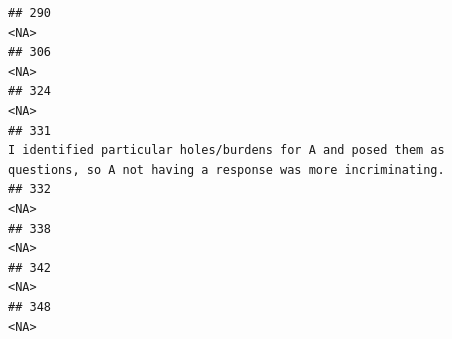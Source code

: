 \documentclass[
]{article}
\begin{document}
\begin{verbatim}
## 290                                                                                                                                                                                                                                                                                                                                                <NA>
## 306                                                                                                                                                                                                                                                                                                                                                <NA>
## 324                                                                                                                                                                                                                                                                                                                                                <NA>
## 331                                                                                                                                                                                                                         I identified particular holes/burdens for A and posed them as questions, so A not having a response was more incriminating.
## 332                                                                                                                                                                                                                                                                                                                                                <NA>
## 338                                                                                                                                                                                                                                                                                                                                                <NA>
## 342                                                                                                                                                                                                                                                                                                                                                <NA>
## 348                                                                                                                                                                                                                                                                                                                                                <NA>

\end{verbatim}
\end{document}
